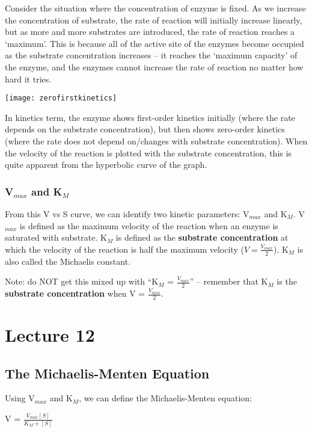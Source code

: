 \documentclass[a4paper, 12pt]{report}
\newcommand{\mychapter}[2]{
    \setcounter{chapter}{#1}
    \setcounter{section}{0}
    \chapter*{#2}
    \addcontentsline{toc}{chapter}{#2}
}
\begin{document}
Consider the situation where the concentration of enzyme is fixed.
As we increase the concentration of substrate, the rate of reaction will initially increase linearly, but as more and more substrates are introduced, the rate of reaction reaches a `maximum'.
This is because all of the active site of the enzymes become occupied as the substrate concentration increases -- it reaches the `maximum capacity' of the enzyme, and the enzymes cannot increase the rate of reaction no matter how hard it tries.

\begin{center}
\texttt{[image: zerofirstkinetics]}
\end{center}

In kinetics term, the enzyme shows first-order kinetics initially (where the rate depends on the substrate concentration), but then shows zero-order kinetics (where the rate does not depend on/changes with substrate concentration).
When the velocity of the reaction is plotted with the substrate concentration, this is quite apparent from the hyperbolic curve of the graph.

\subsection{V$_{max}$ and K$_M$}

From this V vs S curve, we can identify two kinetic parameters: V$_{max}$ and K$_M$.
V$_{max}$ is defined as the maximum velocity of the reaction when an enzyme is saturated with substrate.
K$_M$ is defined as the \textbf{substrate concentration} at which the velocity of the reaction is half the maximum velocity ($V = \frac{V_{max}}{2}$).
K$_M$ is also called the Michaelis constant.

Note: do NOT get this mixed up with ``K$_M$ = $\frac{V_{max}}{2}$'' -- remember that K$_M$ is the \textbf{substrate concentration} when V = $\frac{V_{max}}{2}$.

\mychapter{12}{Lecture 12}

\section{The Michaelis-Menten Equation}

Using V$_{max}$ and K$_M$, we can define the Michaelis-Menten equation:

\begin{center}
\large{V = $\frac{V_{max} [S]}{K_M + [S]}$}
\end{center}
\end{document}
